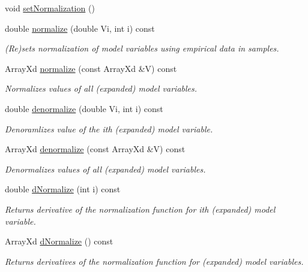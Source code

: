 \begin{DoxyCompactItemize}
void \hyperlink{class_go_s_u_m_1_1_c_model_variables_a28359235bd83070fa2c40bdeeb90fe01}{set\-Normalization} ()
\item 
double \hyperlink{class_go_s_u_m_1_1_c_model_variables_abf4db473db4a17e0010cae650aa0d907}{normalize} (double Vi, int i) const 
\begin{DoxyCompactList}\small\item\em (Re)sets normalization of model variables using empirical data in samples. \end{DoxyCompactList}\item 
Array\-Xd \hyperlink{class_go_s_u_m_1_1_c_model_variables_ac2bbbbc99a0717ab9d5d501b0cf86427}{normalize} (const Array\-Xd \&V) const 
\begin{DoxyCompactList}\small\item\em Normalizes values of all (expanded) model variables. \end{DoxyCompactList}\item 
double \hyperlink{class_go_s_u_m_1_1_c_model_variables_a42b21bbfdd60a640f0925802035bd772}{denormalize} (double Vi, int i) const 
\begin{DoxyCompactList}\small\item\em Denoramlizes value of the ith (expanded) model variable. \end{DoxyCompactList}\item 
Array\-Xd \hyperlink{class_go_s_u_m_1_1_c_model_variables_aefcc9a87015565230d6f8dd0897173bd}{denormalize} (const Array\-Xd \&V) const 
\begin{DoxyCompactList}\small\item\em Denormalizes values of all (expanded) model variables. \end{DoxyCompactList}\item 
double \hyperlink{class_go_s_u_m_1_1_c_model_variables_a3e372277479386d4ed795b718296b439}{d\-Normalize} (int i) const 
\begin{DoxyCompactList}\small\item\em Returns derivative of the normalization function for ith (expanded) model variable. \end{DoxyCompactList}\item 
Array\-Xd \hyperlink{class_go_s_u_m_1_1_c_model_variables_a1a029447ceb9c51a71bd22ccf4a01802}{d\-Normalize} () const 
\begin{DoxyCompactList}\small\item\em Returns derivatives of the normalization function for (expanded) model variables. \end{DoxyCompactList}\item 

\end{DoxyCompactItemize}
